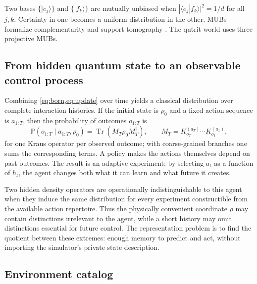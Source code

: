 \documentclass[11pt]{article}
\newcommand{\Prob}{\mathbb P}
\newcommand{\Tr}{\operatorname{Tr}}
\begin{document}
Two bases $\{|e_j\rangle\}$ and $\{|f_k\rangle\}$ are mutually unbiased when
$|\langle e_j|f_k\rangle|^2=1/d$ for all $j,k$. Certainty in one becomes a
uniform distribution in the other. MUBs formalize complementarity and support
tomography \cite{durt2010}. The qutrit world uses three projective MUBs.

\subsection{From hidden quantum state to an observable control process}

Combining \cref{eq:born,eq:update} over time yields a classical distribution
over complete interaction histories. If the initial state is $\rho_0$ and a
fixed action sequence is $a_{1:T}$, then the probability of outcomes
$o_{1:T}$ is
\begin{equation}
 \Prob(o_{1:T}\mid a_{1:T},\rho_0)
 =\Tr\!\left(M_T\rho_0M_T^\dagger\right),\qquad
 M_T=K_{o_T}^{(a_T)}\cdots K_{o_1}^{(a_1)},
 \label{eq:history-prob}
\end{equation}
for one Kraus operator per observed outcome; with coarse-grained branches one
sums the corresponding terms. A policy makes the actions themselves depend on
past outcomes. The result is an adaptive experiment: by selecting $a_t$ as a
function of $h_t$, the agent changes both what it can learn and what future it
creates.

Two hidden density operators are operationally indistinguishable to this agent
when they induce the same distribution for every experiment constructible from
the available action repertoire. Thus the physically convenient coordinate
$\rho$ may contain distinctions irrelevant to the agent, while a short history
may omit distinctions essential for future control. The representation problem
is to find the quotient between these extremes: enough memory to predict and
act, without importing the simulator's private state description.

\subsection{Environment catalog}
\end{document}
